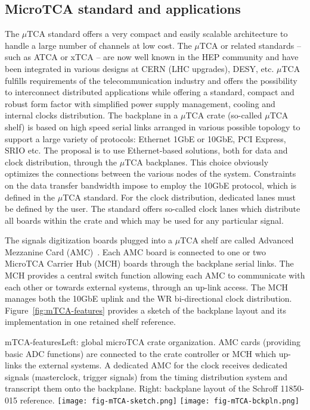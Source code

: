 \subsection{MicroTCA standard and applications}
The $\mu$TCA standard offers a very compact and easily scalable architecture to handle a large number of channels at low cost. The $\mu$TCA or related standards -- such as ATCA or xTCA -- are now well known in the HEP community and have been integrated in various designs at CERN (LHC upgrades), DESY, etc.  $\mu$TCA fulfills requirements of the telecommunication industry and offers the possibility to interconnect distributed applications while offering a standard, compact and robust form factor with simplified power supply management, cooling and internal clocks distribution. The backplane in a $\mu$TCA crate  (so-called $\mu$TCA shelf)  is based on high speed serial links arranged in various possible topology to support a large variety of protocols: Ethernet 1GbE or 10GbE, PCI Express, SRIO etc. The proposal is to use Ethernet-based solutions, both for data and clock distribution, through the $\mu$TCA backplanes. This choice obviously optimizes the connections between the various nodes of the system. Constraints on the data transfer bandwidth impose to employ the 10GbE protocol, which is defined in the $\mu$TCA standard. For the clock distribution, dedicated lanes must be defined by the user. The standard offers so-called clock lanes which distribute all boards within the crate and which  may be used for any particular signal. 

The signals digitization boards plugged into a $\mu$TCA shelf are called Advanced Mezzanine Card (AMC)~\cite{picmg-2006}. Each AMC board is connected to one or two MicroTCA Carrier Hub (MCH) boards through the backplane serial links. The MCH provides a central switch function allowing each AMC to communicate with each other or towards external systems, through an up-link access. The MCH manages both the 10GbE uplink and the WR bi-directional clock distribution.  
 Figure~\ref{fig:mTCA-features} provides a sketch of the backplane layout and its implementation in one retained shelf reference.

\begin{cdrfigure}{mTCA-features}{\small Left: global microTCA crate organization. AMC cards (providing basic ADC functions) are connected to the crate controller or MCH which up-links the external systems. A dedicated AMC for the clock receives dedicated signals (masterclock, trigger signals) from the timing distribution system and transcript them onto the backplane. Right: backplane layout of the Schroff 11850-015 reference.}
\texttt{[image: fig-mTCA-sketch.png]}\hfill
\texttt{[image: fig-mTCA-bckpln.png]}
\end{cdrfigure}

